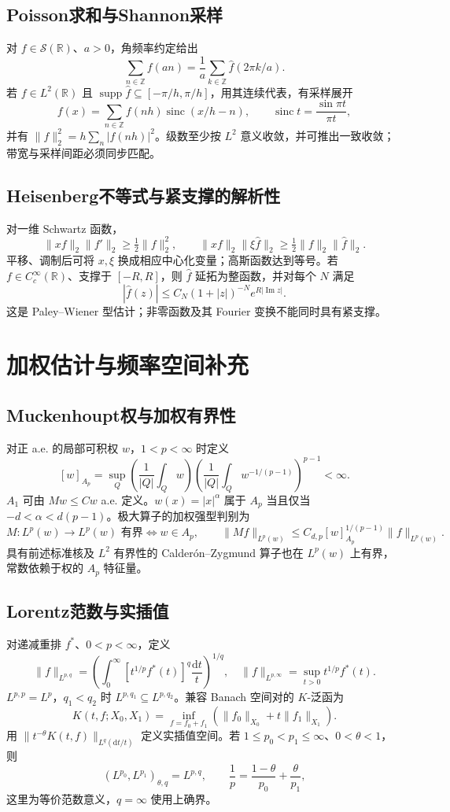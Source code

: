 \documentclass[../main.tex]{subfiles}
\begin{document}
\subsection{Poisson求和与Shannon采样}
对 $f\in\mathcal S(\mathbb R)$、$a>0$，角频率约定给出
\[
\sum_{n\in\mathbb Z}f(an)=\frac1a\sum_{k\in\mathbb Z}\widehat f(2\pi k/a).
\]
若 $f\in L^2(\mathbb R)$ 且 $\operatorname{supp}\widehat f\subseteq[-\pi/h,\pi/h]$，用其连续代表，有采样展开
\[
f(x)=\sum_{n\in\mathbb Z}f(nh)\operatorname{sinc}(x/h-n),\qquad
\operatorname{sinc}t=\frac{\sin\pi t}{\pi t},
\]
并有 $\|f\|_2^2=h\sum_n|f(nh)|^2$。级数至少按 $L^2$ 意义收敛，并可推出一致收敛；带宽与采样间距必须同步匹配。
\subsection{Heisenberg不等式与紧支撑的解析性}
对一维 Schwartz 函数，
\[
\|xf\|_2\|f'\|_2\ge\tfrac12\|f\|_2^2,\qquad
\|xf\|_2\|\xi\widehat f\|_2\ge\tfrac12\|f\|_2\|\widehat f\|_2.
\]
平移、调制后可将 $x,\xi$ 换成相应中心化变量；高斯函数达到等号。若 $f\in C_c^\infty(\mathbb R)$、支撑于 $[-R,R]$，则 $\widehat f$ 延拓为整函数，并对每个 $N$ 满足
\[
|\widehat f(z)|\le C_N(1+|z|)^{-N}e^{R|\operatorname{Im}z|}.
\]
这是 Paley--Wiener 型估计；非零函数及其 Fourier 变换不能同时具有紧支撑。
\section{加权估计与频率空间补充}
\subsection{Muckenhoupt权与加权有界性}
对正 a.e. 的局部可积权 $w$，$1<p<\infty$ 时定义
\[
[w]_{A_p}=\sup_Q\left(\frac1{|Q|}\int_Qw\right)
\left(\frac1{|Q|}\int_Qw^{-1/(p-1)}\right)^{p-1}<\infty.
\]
$A_1$ 可由 $Mw\le Cw$ a.e. 定义。$w(x)=|x|^\alpha$ 属于 $A_p$ 当且仅当 $-d<\alpha<d(p-1)$。极大算子的加权强型判别为
\[
M:L^p(w)\to L^p(w)\text{ 有界}\iff w\in A_p,\qquad
\|Mf\|_{L^p(w)}\le C_{d,p}[w]_{A_p}^{1/(p-1)}\|f\|_{L^p(w)}.
\]
具有前述标准核及 $L^2$ 有界性的 Calderón--Zygmund 算子也在 $L^p(w)$ 上有界，常数依赖于权的 $A_p$ 特征量。
\subsection{Lorentz范数与实插值}
对递减重排 $f^*$、$0<p<\infty$，定义
\[
\|f\|_{L^{p,q}}=\left(\int_0^\infty[t^{1/p}f^*(t)]^q\frac{\mathrm dt}t\right)^{1/q},\quad
\|f\|_{L^{p,\infty}}=\sup_{t>0}t^{1/p}f^*(t).
\]
$L^{p,p}=L^p$，$q_1<q_2$ 时 $L^{p,q_1}\subseteq L^{p,q_2}$。兼容 Banach 空间对的 $K$-泛函为
\[
K(t,f;X_0,X_1)=\inf_{f=f_0+f_1}(\|f_0\|_{X_0}+t\|f_1\|_{X_1}).
\]
用 $\|t^{-\theta}K(t,f)\|_{L^q(\mathrm dt/t)}$ 定义实插值空间。若 $1\le p_0<p_1\le\infty$、$0<\theta<1$，则
\[
(L^{p_0},L^{p_1})_{\theta,q}=L^{p,q},\qquad
\frac1p=\frac{1-\theta}{p_0}+\frac\theta{p_1},
\]
这里为等价范数意义，$q=\infty$ 使用上确界。
\end{document}
